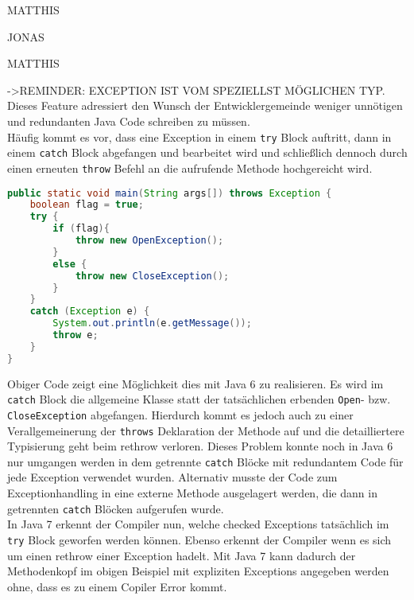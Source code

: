 \documentclass[times, 10pt,twocolumn]{article}
\begin{document}
MATTHIS

JONAS

MATTHIS

->REMINDER: EXCEPTION IST VOM SPEZIELLST MÖGLICHEN TYP.
Dieses Feature adressiert den Wunsch der Entwicklergemeinde weniger unnötigen und redundanten Java Code schreiben zu müssen.\cite{sbJ7exeptions}\\

Häufig kommt es vor, dass eine Exception in einem \texttt{try} Block auftritt, dann in einem \texttt{catch} Block abgefangen und bearbeitet wird und schließlich dennoch durch einen erneuten \texttt{throw} Befehl an die aufrufende Methode hochgereicht wird.

\begin{lstlisting}[language=java,breaklines=true]
public static void main(String args[]) throws Exception {
    boolean flag = true;
    try {
        if (flag){
            throw new OpenException();
        }
        else {
            throw new CloseException();
        }
    }
    catch (Exception e) {
        System.out.println(e.getMessage());
        throw e;
    }
}
\end{lstlisting}

Obiger Code\cite{sbJ7exeptions} zeigt eine Möglichkeit dies mit Java 6 zu realisieren. Es wird im \texttt{catch} Block die allgemeine  Klasse statt der tatsächlichen erbenden \texttt{Open}- bzw. \texttt{CloseException} abgefangen. Hierdurch kommt es jedoch auch zu einer Verallgemeinerung der \texttt{throws} Deklaration der Methode auf  und die detailliertere Typisierung geht beim rethrow verloren. Dieses Problem konnte noch in Java 6 nur umgangen werden in dem getrennte \texttt{catch} Blöcke mit redundantem Code für jede Exception verwendet wurden. Alternativ musste der Code zum Exceptionhandling in eine externe Methode ausgelagert werden, die dann in getrennten \texttt{catch} Blöcken aufgerufen wurde.\cite{scjp6}\\

In Java 7 erkennt der Compiler nun, welche checked Exceptions tatsächlich im \texttt{try} Block geworfen werden können. Ebenso erkennt der Compiler wenn es sich um einen rethrow einer Exception hadelt. Mit Java 7 kann dadurch der Methodenkopf im obigen Beispiel mit expliziten Exceptions angegeben werden ohne, dass es zu einem Copiler Error kommt\cite{sbJ7exeptions}.
\end{document}
